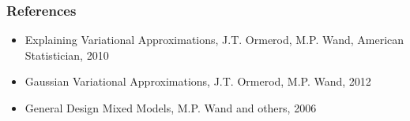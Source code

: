 \documentclass{beamer}
\begin{document}
\begin{frame}
\frametitle{References}
\begin{itemize}
\item Explaining Variational Approximations, J.T. Ormerod, M.P. Wand, American Statistician, 2010
\item Gaussian Variational Approximations, J.T. Ormerod, M.P. Wand, 2012
\item General Design Mixed Models, M.P. Wand and others, 2006
\end{itemize}
\end{frame}
\end{document}
